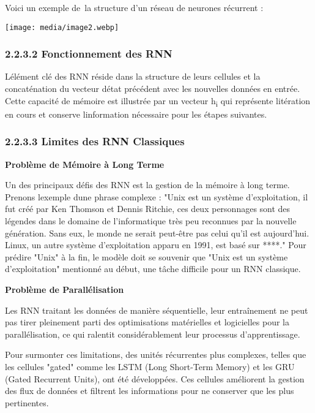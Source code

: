 \documentclass[
]{article}
\begin{document}
Voici un exemple de~la structure d'un réseau de neurones récurrent :

\texttt{[image: media/image2.webp]}

\subsubsection{2.2.3.2 Fonctionnement des
RNN}\label{fonctionnement-des-rnn}

L\textquotesingle élément clé des RNN réside dans la structure de leurs
cellules et la concaténation du vecteur d\textquotesingle état précédent
avec les nouvelles données en entrée. Cette capacité de mémoire est
illustrée par un vecteur h\textsubscript{i} qui représente
l\textquotesingle itération en cours et conserve
l\textquotesingle information nécessaire pour les étapes suivantes.

\subsubsection{2.2.3.3 Limites des RNN
Classiques}\label{limites-des-rnn-classiques}

\textbf{Problème de Mémoire à Long Terme}

Un des principaux défis des RNN est la gestion de la mémoire à long
terme. Prenons l\textquotesingle exemple d\textquotesingle une phrase
complexe : "Unix est un système d'exploitation, il fut créé par Ken
Thomson et Dennis Ritchie, ces deux personnages sont des légendes dans
le domaine de l'informatique très peu reconnues par la nouvelle
génération. Sans eux, le monde ne serait peut-être pas celui qu'il est
aujourd'hui. Linux, un autre système d'exploitation apparu en 1991, est
basé sur ****." Pour prédire "Unix" à la fin, le modèle doit se souvenir
que "Unix est un système d'exploitation" mentionné au début, une tâche
difficile pour un RNN classique.

\textbf{Problème de Parallélisation}

Les RNN traitant les données de manière séquentielle, leur entraînement
ne peut pas tirer pleinement parti des optimisations matérielles et
logicielles pour la parallélisation, ce qui ralentit considérablement
leur processus d'apprentissage.

Pour surmonter ces limitations, des unités récurrentes plus complexes,
telles que les cellules "gated" comme les LSTM (Long Short-Term Memory)
et les GRU (Gated Recurrent Units), ont été développées. Ces cellules
améliorent la gestion des flux de données et filtrent les informations
pour ne conserver que les plus pertinentes.
\end{document}
